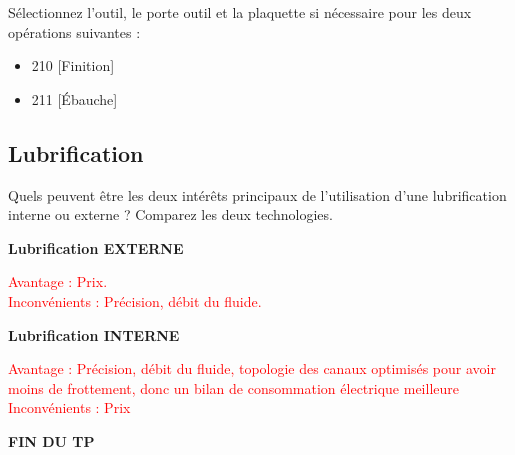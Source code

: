 \documentclass[12pt,a4paper]{article} %
\begin{document}
  \begin{exo} Sélectionnez l'outil, le porte outil et la plaquette si nécessaire pour les deux opérations suivantes :
\begin{itemize}
    \item 210 [Finition]
    \item 211 [Ébauche]
\end{itemize}
\end{exo}


\marginnote{1 pt }



\marginnote{1 pt}


\newpage

\subsection{Lubrification}

\begin{exo} Quels peuvent être les deux intérêts principaux de l'utilisation d'une lubrification interne ou externe ? Comparez les deux technologies.\end{exo}
\begin{center}
    \textbf{Lubrification EXTERNE}
\end{center}

\textcolor{red}{Avantage : Prix.} \\

\textcolor{red}{Inconvénients : Précision, débit du fluide.}

\begin{center}
    \textbf{Lubrification INTERNE}
\end{center}

\textcolor{red}{Avantage :  Précision, débit du fluide, topologie des canaux optimisés pour avoir moins de frottement, donc un bilan de consommation électrique meilleure} \\

\textcolor{red}{Inconvénients : Prix}







\begin{center}
    \textbf{FIN DU TP}
\end{center}



\end{document}
